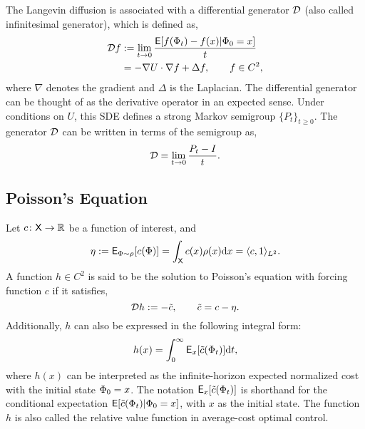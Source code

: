 The Langevin diffusion is associated with a differential generator ${\cal D}$ (also called infinitesimal generator), which is defined as,
\begin{equation}
\begin{aligned}
\generate f &:= \lim_{t \to 0} \frac{\Expect [ f(\markovstate_t) - f(x) | \markovstate_0 = x]}{t} \\
& = -\nabla \pot \cdot \nabla f + \Delta f,\qquad f\in C^2,
\label{e:langevin_generator}
\end{aligned}
\end{equation}
where $\nabla$ denotes the gradient and $\Delta$ is the Laplacian. The differential generator can be thought of as the derivative operator in an expected sense. Under conditions on $U$, this SDE defines a strong Markov semigroup $\{P_t\}_{t \geq 0}$. The generator ${\cal D}$ can be written in terms of the semigroup as,
\begin{equation}
\generate = \lim_{t \to 0} \frac{P_t - I}{t}.
\label{e:lang_generate_semigroup}
\end{equation}

\subsection{Poisson's Equation}
Let $c \colon {\sf X} \to \mathbb{R}$ be a function of interest, and 
\begin{equation}
\eta := {\sf E}_{\Phi \sim \rho}[c(\Phi)] =  \int_{\sf X} c(x) \rho(x) \text{d} x = \langle c, 1 \rangle_{L^2}.
\end{equation}
A function $h\in C^2$ is said to be the solution to Poisson's equation with forcing function $c$ if it satisfies,
\begin{equation}
\generate h := - \tilc, \qquad  \tilc = c - \eta.
\label{e:poissons}
\end{equation}
Additionally, $h$ can also be expressed in the following integral form:
\begin{equation}
h(x) =\int_0^\infty {\sf E}_x[\tilde c(\Phi_t)] \text{d} t,
\end{equation}
where $h(x)$ can be interpreted as the infinite-horizon expected normalized cost with the initial state $\Phi_0 = x$. The notation ${\sf E}_x[\tilde c(\Phi_t)]$ is shorthand for the conditional expectation ${\sf E}[\tilde c(\Phi_t)|\Phi_0 = x]$, with $x$ as the initial state. The function $h$ is also called the relative value function in average-cost optimal control.  

